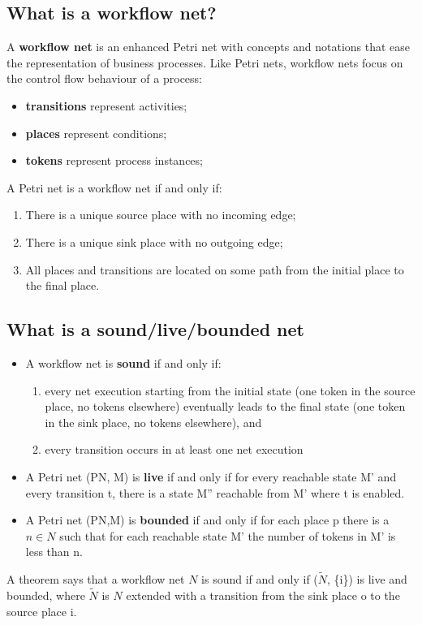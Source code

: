 \subsection{ What is a workflow net?}
A \textbf{workflow net} is an enhanced Petri net with concepts and notations that ease the representation of business processes.
Like Petri nets, workflow nets focus on the control flow behaviour of a process:
\begin{itemize}
   \item \textbf{transitions} represent activities;
   \item \textbf{places} represent conditions;
   \item \textbf{tokens} represent process instances;
\end{itemize}
A Petri net is a workflow net if and only if:
\begin{enumerate}
   \item There is a unique source place with no incoming edge;
   \item There is a unique sink place with no outgoing edge;
   \item All places and transitions are located on some path from the initial place to the final place.
\end{enumerate}

\subsection{What is a sound/live/bounded net}
\begin{itemize}
   \item A workflow net is \textbf{sound} if and only if:
         \begin{enumerate}
            \item  every net execution starting from the initial state (one token in the source place, no tokens elsewhere) eventually leads to the final state (one token in the sink place, no tokens elsewhere), and
            \item every transition occurs in at least one net execution
         \end{enumerate}
   \item A Petri net (PN, M) is \textbf{live} if and only if for every reachable state M' and every transition t, there is a state M'' reachable from M' where t is enabled.
   \item A Petri net (PN,M) is \textbf{bounded} if and only if for each place p there is a $n \in N$ such that for each reachable state M' the number of tokens in M' is less than n.

\end{itemize}
A theorem says that a workflow net $N$ is sound if and only if ($\tilde{N}$, \{i\}) is live and bounded, where $\tilde{N}$ is $N$ extended with a transition from the sink place o to the source place i.

